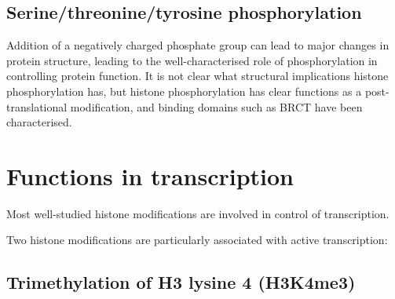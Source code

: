 \hypertarget{serinethreoninetyrosine-phosphorylation}{%
\subsection{Serine/threonine/tyrosine phosphorylation}\label{serinethreoninetyrosine-phosphorylation}}

Addition of a negatively charged phosphate group can lead to major changes in protein structure, leading to the well-characterised role of phosphorylation in controlling protein function. It is not clear what structural implications histone phosphorylation has, but histone phosphorylation has clear functions as a post-translational modification, and binding domains such as BRCT have been characterised.

\hypertarget{functions-in-transcription}{%
\section{Functions in transcription}\label{functions-in-transcription}}

Most well-studied histone modifications are involved in control of transcription.

Two histone modifications are particularly associated with active transcription:

\hypertarget{trimethylation-of-h3-lysine-4-h3k4me3}{%
\subsection{Trimethylation of H3 lysine 4 (H3K4me3)}\label{trimethylation-of-h3-lysine-4-h3k4me3}}

